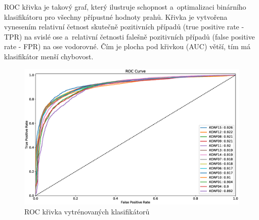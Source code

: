 ROC křivka je takový graf, který ilustruje schopnost a~optimalizaci binárního klasifikátoru pro všechny přípustné hodnoty prahů. Křivka je vytvořena vynesením relativní četnost skutečně pozitivních případů (true positive rate - TPR) na svislé ose a~relativní četnosti falešně pozitivních případů (false positive rate - FPR) na ose vodorovné. Čím je plocha pod křivkou (AUC) větší, tím má klasifikátor menší chybovost. 

\begin{figure}[H]
\centering
\includegraphics[width=16cm]{figures/roc1}
\caption{ROC křivka vytrénovaných klasifikátorů}
\label{fig:rocCurve1}
\end{figure}

